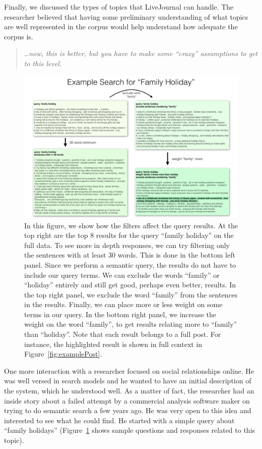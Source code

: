 \documentclass{sigchi}
\begin{document}
Finally, we discussed the types of topics that LiveJournal can handle. The researcher believed that having some preliminary understanding of what topics are well represented in the corpus would help understand how adequate the corpus is. 

\begin{quote}
{\em
\dots now, this is better, but you have to make some ``crazy'' assumptions to get to this level.
}\end{quote}


\begin{figure}[ht]
\centering \includegraphics[width=.85\textwidth]{figures/results_1}
\caption{In this figure, we show how the filters affect the query results. 
At the top right are the top 8 results for the query ``family holiday'' on the full data.  
To see more in depth responses, we can try filtering only the sentences with at least 30 words. 
This is done in the bottom left panel. 
Since we perform a semantic query, the results do not have to include our query terms. 
We can exclude the words ``family'' or ``holiday''  entirely and still get good, perhaps even better, results.
In the top right panel, we exclude the word ``family'' from the sentences in the results.
Finally, we can place more or less weight on some terms in our query. 
In the bottom right panel, we increase the weight on the word ``family'', 
to get results relating more to ``family'' than ``holiday''.  
Note that each result belongs to a full post. For instance, the highlighted result is shown in full context in Figure~\ref{fig:examplePost}. 
\label{fig:familyHolidays} }
\end{figure}

One more interaction with a researcher focused on social relationships online. He was well versed in search models and he wanted to have an initial description of the system, which he understood well. As a matter of fact, the researcher had an inside story about a failed attempt by a commercial analysis software maker on trying to do semantic search a few years ago. He was very open to this idea and interested to see what he could find. He started with a simple query about ``family holidays'' (Figure~\ref{fig:familyHolidays} shows sample questions and responses related to this topic).
\end{document}
